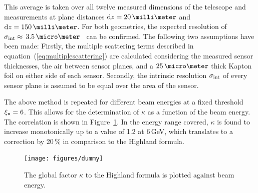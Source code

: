 \noindent
This average is taken over all twelve measured dimensions of the telescope and measurements at plane distances $\dz =  20\,\milli\meter$ and $\dz =  150\,\milli\meter$. 
For both geometries, the expected resolution of $\sigmai \approx\,3.5\,\micro\meter$~\cite{ref:mimosa26} can be confirmed.
The following two assumptions have been made: 
Firstly, the multiple scattering terms described in equation~(\ref{eq:multiplescattering}) are calculated considering the measured sensor thicknesses, the air between sensor planes, and a $25\,\micro\meter$
thick Kapton foil on either side of each sensor.
Secondly, the intrinsic resolution $\sigma_{\textrm{int}}$ of every sensor plane is assumed to be equal over the area of the sensor. 


The above method is repeated for different beam energies at a fixed threshold $\xi_{\textrm{n}} = 6$. 
This allows for the determination of $\kappa$ as a function of the beam energy. 
The correlation is shown in Figure~\ref{fig:HL_factor}. 
In the energy range covered, $\kappa$ is found to increase monotonically up to a value of 1.2 at 6\,GeV, which translates to a correction by 20\,\% in comparison to the Highland formula. 

\begin{figure}[ht!]
  \centering
  \texttt{[image: figures/dummy]}
  \caption[HL Factor]{
  The global factor $\kappa$ to the Highland formula is plotted against beam energy.
  }
  \label{fig:HL_factor}
\end{figure}

